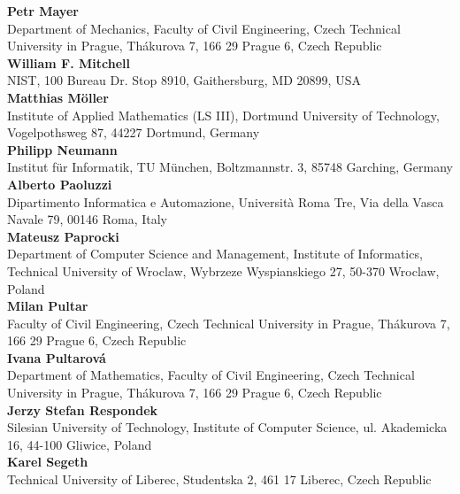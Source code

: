 \noindent
{\bf Petr Mayer}\\
Department of Mechanics,
Faculty of Civil Engineering,
Czech Technical University in Prague,
Th\'akurova 7,
166 29 Prague 6,
Czech Republic\\

\noindent
{\bf William F. Mitchell}\\
NIST, 100 Bureau Dr. Stop 8910,
Gaithersburg, MD 20899,
USA\\

\noindent
{\bf Matthias M\"oller}\\
Institute of Applied Mathematics (LS III),
Dortmund University of Technology,
Vogelpothsweg 87,
44227 Dortmund,
Germany\\

\noindent
{\bf Philipp Neumann}\\
Institut f\"ur Informatik,
TU M\"unchen,
Boltzmannstr. 3,
85748 Garching,
Germany\\

\noindent
{\bf Alberto Paoluzzi}\\
Dipartimento Informatica e Automazione,
Universit\`a Roma Tre,
Via della Vasca Navale 79,
00146 Roma,
Italy\\

\noindent
{\bf Mateusz Paprocki}\\
Department of Computer Science and Management,
Institute of Informatics,
Technical University of Wroclaw,
Wybrzeze Wyspianskiego 27,
50-370 Wroclaw,
Poland\\

\noindent
{\bf Milan Pultar}\\
Faculty of Civil Engineering,
Czech Technical University in Prague,
Th\'akurova 7,
166 29 Prague 6,
Czech Republic\\

\noindent
{\bf Ivana Pultarov\'a}\\
Department of Mathematics,
Faculty of Civil Engineering,
Czech Technical University in Prague,
Th\'akurova 7,
166 29 Prague 6,
Czech Republic\\

\noindent
{\bf Jerzy Stefan Respondek}\\
Silesian University of Technology,
Institute of Computer Science,
ul. Akademicka 16,
44-100 Gliwice,
Poland\\

\noindent
{\bf Karel Segeth}\\
Technical University of Liberec,
Studentska 2,
461 17 Liberec,
Czech Republic\\

